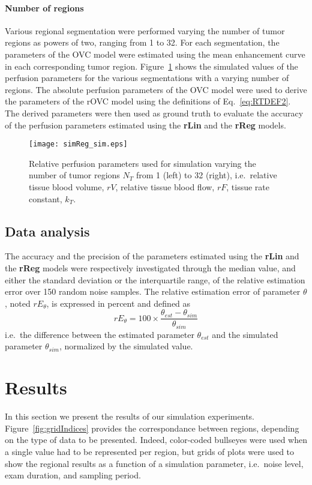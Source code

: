 \paragraph{Number of regions}
Various regional segmentation were performed varying the number of tumor regions as powers of two, ranging from 1 to 32.
For each segmentation, the parameters of the OVC model were estimated using the mean enhancement curve in each corresponding tumor region.
Figure~\ref{fig:simReg} shows the simulated values of the perfusion parameters for the various segmentations with a varying number of regions. 
The absolute perfusion parameters of the OVC model were used to derive the parameters of the rOVC model using the definitions of Eq.~\ref{eq:RTDEF2}.
The derived parameters were then used as ground truth to evaluate the accuracy of the perfusion parameters estimated using the \textbf{rLin} and the \textbf{rReg} models.

\begin{figure}
\texttt{[image: simReg\_sim.eps]}
\caption{Relative perfusion parameters used for simulation varying the number of tumor regions $N_T$ from 1 (left) to 32 (right), i.e.~relative tissue blood volume, $rV$, relative tissue blood flow, $rF$, tissue rate constant, $k_T$.}
\label{fig:simReg}
\end{figure}

\subsection{Data analysis}\label{sec:dataAnalysis}
The accuracy and the precision of the parameters estimated using the \textbf{rLin} and the \textbf{rReg} models were respectively investigated through the median value, and either the standard deviation or the interquartile range, of the relative estimation error over 150 random noise samples.
The relative estimation error of parameter $\theta$, noted $rE_{\theta}$, is expressed in percent and defined as
\begin{equation}
rE_{\theta} = 100 \times \frac{\theta_{est}-\theta_{sim}}{\theta_{sim}}
\end{equation}
i.e.~the difference between the estimated parameter $\theta_{est}$ and the simulated parameter $\theta_{sim}$, normalized by the simulated value.

\section{Results}
In this section we present the results of our simulation experiments.
Figure~\ref{fig:gridIndices} provides the correspondance between regions, depending on the type of data to be presented.
Indeed, color-coded bullseyes were used when a single value had to be represented per region, but grids of plots were used to show the regional results as a function of a simulation parameter, i.e.~noise level, exam duration, and sampling period.

